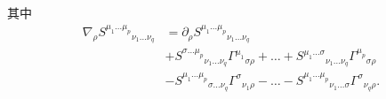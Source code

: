 \begin{definition}
\begin{equation}
			\end{equation}
			其中
			\begin{equation}
				\begin{split}
					\nabla_{\rho}{S^{\mu_1\dots\mu_p}}_{\nu_1\dots\nu_q}&=\partial_\rho{S^{\mu_1\dots\mu_p}}_{\nu_1\dots\nu_q}\\
					&+{S^{\sigma\dots\mu_p}}_{\nu_1\dots\nu_q}{\varGamma^{\mu_1}}_{\sigma\rho}+\dots+{S^{\mu_1\dots\sigma}}_{\nu_1\dots\nu_q}{\varGamma^{\mu_p}}_{\sigma\rho}\\
					&-{S^{\mu_1\dots\mu_p}}_{\sigma\dots\nu_q}{\varGamma^{\sigma}}_{\nu_1\rho}-\dots-{S^{\mu_1\dots\mu_p}}_{\nu_1\dots\sigma}{\varGamma^{\sigma}}_{\nu_q\rho}.
				\end{split}		
			\end{equation}
		\end{definition}


\newpage
	
	
	
		